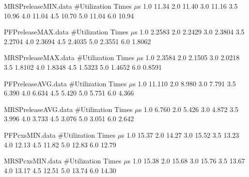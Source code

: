 \begin{filecontents}{MRSPreleaseMIN.data}
#Utilization   Times $\mu$s
1.0  11.34
2.0  11.40
3.0  11.16
3.5  10.96
4.0  11.04
4.5  10.70
5.0  11.04
6.0  10.94
\end{filecontents}


\begin{filecontents}{PFPreleaseMAX.data}
#Utilization   Times $\mu$s
1.0  2.2583
2.0  2.2429
3.0  2.3804
3.5  2.2704
4.0  2.3694
4.5  2.4035
5.0  2.3551
6.0  1.8062
\end{filecontents}

\begin{filecontents}{MRSPreleaseMAX.data}
#Utilization   Times $\mu$s
1.0  2.3584
2.0  2.1505
3.0  2.0218
3.5  1.8102
4.0  1.8348
4.5  1.5323
5.0  1.4652
6.0  0.8591
\end{filecontents}

\begin{filecontents}{PFPreleaseAVG.data}
#Utilization   Times $\mu$s
1.0  11.110
2.0  8.980
3.0  7.791
3.5  6.390
4.0  6.634
4.5  5.420
5.0  5.751
6.0  4.366
\end{filecontents}

\begin{filecontents}{MRSPreleaseAVG.data}
#Utilization   Times $\mu$s
1.0  6.760
2.0  5.426
3.0  4.872
3.5  3.996
4.0  3.733
4.5  3.076
5.0  3.051
6.0  2.642
\end{filecontents}


\begin{filecontents}{PFPcxsMIN.data}
#Utilization   Times $\mu$s
1.0  15.37
2.0  14.27
3.0  15.52
3.5  13.23
4.0  12.13
4.5  11.82
5.0  12.83
6.0  12.79
\end{filecontents}

\begin{filecontents}{MRSPcxsMIN.data}
#Utilization   Times $\mu$s
1.0  15.38
2.0  15.68
3.0  15.76
3.5  13.67
4.0  13.17
4.5  12.51
5.0  13.74
6.0  14.30
\end{filecontents}


